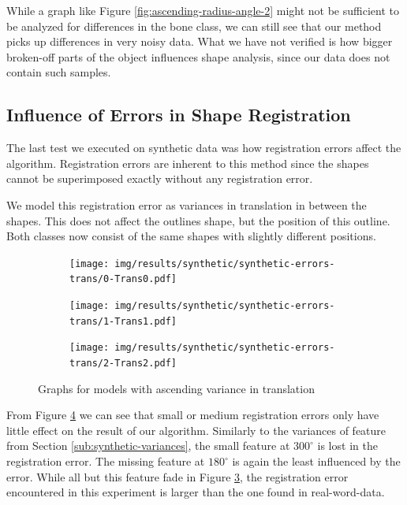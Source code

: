 \documentclass[pdftex,12pt,a4paper]{report}
\begin{document}
While a graph like Figure \ref{fig:ascending-radius-angle-2} might not be sufficient to be analyzed for differences in the bone class, we can still see that our method picks up differences in very noisy data. What we have not verified is how bigger broken-off parts of the object influences shape analysis, since our data does not contain such samples.

\subsection{Influence of Errors in Shape Registration}

The last test we executed on synthetic data was how registration errors affect the algorithm. Registration errors are inherent to this method since the shapes cannot be superimposed exactly without any registration error.

We model this registration error as variances in translation in between the shapes. This does not affect the outlines shape, but the position of this outline. Both classes now consist of the same shapes with slightly different positions.

\begin{figure}[h]
	\centering
	\begin{subfigure}[b]{0.32\textwidth}
		\centering
		\texttt{[image: img/results/synthetic/synthetic-errors-trans/0-Trans0.pdf]}
		\label{fig:ascending-translation-0}
	\end{subfigure}
	\begin{subfigure}[b]{0.32\textwidth}
		\centering
		\texttt{[image: img/results/synthetic/synthetic-errors-trans/1-Trans1.pdf]}
		\label{fig:ascending-translation-1}
	\end{subfigure}
	\begin{subfigure}[b]{0.32\textwidth}
		\centering
		\texttt{[image: img/results/synthetic/synthetic-errors-trans/2-Trans2.pdf]}
		\label{fig:ascending-translation-2}
	\end{subfigure}
	\caption{Graphs for models with ascending variance in translation}
	\label{fig:ascending-translation}
\end{figure}

From Figure \ref{fig:ascending-translation} we can see that small or medium registration errors only have little effect on the result of our algorithm. Similarly to the variances of feature from Section \ref{sub:synthetic-variances}, the small feature at $300^\circ$ is lost in the registration error. The missing feature at $180^\circ$ is again the least influenced by the error. While all but this feature fade in Figure \ref{fig:ascending-translation-2}, the registration error encountered in this experiment is larger than the one found in real-word-data.
\end{document}
